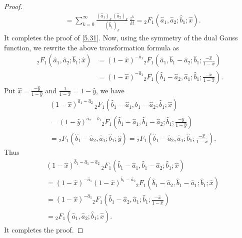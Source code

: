 \documentclass[10pt,a4paper]{amsart}
\begin{document}
\begin{proof}
\begin{align}
	& = \sum_{k = 0}^{\infty} \frac{(\widehat{a}_1)_k \, (\widehat{a}_2)_k}{(\widehat{b}_1)_k} \, \frac{z^k}{k !} = {}_2F_1 (\widehat{a}_1, \widehat{a}_2; \widehat{b}_1; \widehat{x}).
\end{align} 
It completes the proof of \eqref{5.31}. Now, using the symmetry of the dual Gauss function, we rewrite the above transformation formula as
\begin{align}
	{}_2F_1 (\widehat{a}_1, \widehat{a}_2; \widehat{b}_1; \widehat{x}) & = (1 - \widehat{x})^{-\widehat{a}_1} {}_2F_1 \left(\widehat{a}_1, \widehat{b}_1 - \widehat{a}_2; \widehat{b}_1; \frac{-\widehat{x}}{1 - \widehat{x}}\right)\nonumber\\
	& = (1 - \widehat{x})^{-\widehat{a}_1} {}_2F_1 \left(\widehat{b}_1 - \widehat{a}_2, \widehat{a}_1; \widehat{b}_1; \frac{-\widehat{x}}{1 - \widehat{x}}\right).
\end{align}
Put $\widehat{x} = \frac{-\widehat{y}}{1 - \widehat{y}}$ and $\frac{1}{1 - \widehat{x}} = 1 - \widehat{y}$, we have 
\begin{align}
	&(1 - \widehat{x})^{\widehat{a}_1 - \widehat{a}_2}  \, {}_2F_1 (\widehat{b}_1 - \widehat{a}_1, \widehat{b}_1 - \widehat{a}_2; \widehat{b}_1; \widehat{x})\nonumber\\
	& = (1 - \widehat{y})^{\widehat{a}_2 - \widehat{b}_1} {}_2F_1 \left(\widehat{b}_1 - \widehat{a}_1, \widehat{b}_1 - \widehat{a}_2; \widehat{b}_1; \frac{-\widehat{y}}{1-\widehat{y}}\right)\nonumber\\
	& = {}_2F_1 (\widehat{b}_1 - \widehat{a}_2, \widehat{a}_1; \widehat{b}_1; \widehat{y}) = {}_2F_1 \left(\widehat{b}_1 - \widehat{a}_2, \widehat{a}_1; \widehat{b}_1; \frac{-\widehat{x}}{1 - \widehat{x}}\right).
\end{align}
Thus
\begin{align}
	&(1 - \widehat{x})^{\widehat{b}_1 - \widehat{a}_1 - \widehat{a}_2} \, {}_2F_1 (\widehat{b}_1 - \widehat{a}_1, \widehat{b}_1 - \widehat{a}_2; \widehat{b}_1; \widehat{x})\nonumber\\
	 &= (1 - \widehat{x})^{-\widehat{a}_1} (1 - \widehat{x})^{\widehat{b}_1 - \widehat{a}_2} {}_2F_1 (\widehat{b}_1 - \widehat{a}_2, \widehat{b}_1 - \widehat{a}_1; \widehat{b}_1; \widehat{x})\nonumber\\
	& = (1 - \widehat{x})^{-\widehat{a}_1} {}_2F_1 \left(\widehat{b}_1 - \widehat{a}_2, \widehat{a}_1; \widehat{b}_1; \frac{-\widehat{x}}{1 - \widehat{x}}\right) \nonumber\\
	& = {}_2F_1 (\widehat{a}_1, \widehat{a}_2; \widehat{b}_1; \widehat{x}).
\end{align}
It completes the proof.
\end{proof}
\end{document}
